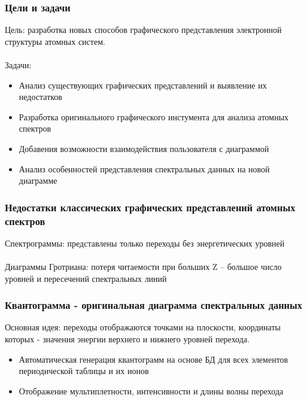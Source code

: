 \documentclass{beamer}
\begin{document}
\begin{frame}
\frametitle{Цели и задачи}
    Цель: разработка новых способов графического представления электронной структуры атомных систем.
     \\~\\
    Задачи:
    \begin{itemize}
        \item Анализ существующих графических представлений и выявление их недостатков
        \item Разработка оригинального графического инстумента для анализа атомных спектров
        \item Добавения возможности взаимодействия пользователя с диаграммой
        \item Анализ особенностей представления спектральных данных на новой диаграмме
    \end{itemize}
\end{frame}

\begin{frame}
\frametitle{Недостатки классических графических представлений атомных спектров}
    Спектрограммы: представлены только переходы без энергетических уровней
     \\~\\
    Диаграммы Гротриана: потеря читаемости при больших Z – большое число уровней и пересечений спектральных линий
\end{frame}

\begin{frame}
\frametitle{Квантограмма - оригинальная диаграмма спектральных данных}
    Основная идея: переходы отображаются точками на плоскости, координаты которых - значения энергии верхнего и нижнего уровней перехода.
    \begin{itemize}
        \item Автоматическая генерация квантограмм на основе БД для всех элементов периодической таблицы и их ионов
        \item Отображение мультиплетности, интенсивности и длины волны перехода
    \end{itemize}
\end{frame}
\end{document}
